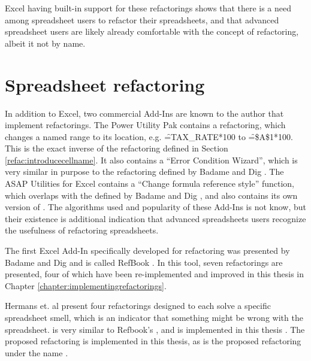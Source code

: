 Excel having built-in support for these refactorings shows that there is a need among spreadsheet users to refactor their spreadsheets, and that advanced spreadsheet users are likely already comfortable with the concept of refactoring, albeit it not by name.

\section{Spreadsheet refactoring}

In addition to Excel, two commercial Add-Ins are known to the author that implement refactorings.
The Power Utility Pak \cite{PuPv7} contains a  refactoring, which changes a named range to its location, e.g. \f{=TAX_RATE*100} to \f{=\$A\$1*100}.
This is the exact inverse of the  refactoring defined in Section \ref{refac:introducecellname}.
It also contains a ``Error Condition Wizard'', which is very similar in purpose to the  refactoring defined by Badame and Dig \cite{badame2012refactoring}.
The ASAP Utilities for Excel \cite{ASAP5} contains a ``Change formula reference style'' function, which overlaps with the  defined by Badame and Dig \cite{badame2012refactoring}, and also contains its own version of .
The algorithms used and popularity of these Add-Ins is not know, but their existence is additional indication that advanced spreadsheets users recognize the usefulness of refactoring spreadsheets.

The first Excel Add-In specifically developed for refactoring was presented by Badame and Dig and is called RefBook \cite{badame2012refactoring}.
In this tool, seven refactorings are presented, four of which have been re-implemented and improved in this thesis in Chapter \ref{chapter:implementingrefactorings}.

Hermans et. al \cite{hermans2014detecting} present four refactorings designed to each solve a specific spreadsheet smell, which is an indicator that something might be wrong with the spreadsheet.
 is very similar to Refbook's , and is implemented in this thesis .
The proposed  refactoring is implemented in this thesis, as is the proposed  refactoring under the name .

